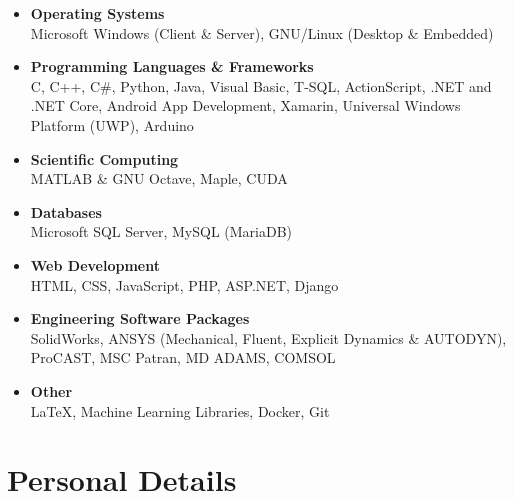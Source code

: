 \documentclass{cv}
\begin{document}
\begin{itemize}

\item
 \textbf{Operating Systems} \\ Microsoft Windows (Client \& Server), GNU/Linux (Desktop \& Embedded)
 \item
\textbf{Programming Languages \& Frameworks}\\  C, C++, C\#, Python, Java, Visual Basic, T-SQL, ActionScript, .NET and .NET Core, Android App Development, Xamarin, Universal Windows Platform (UWP), Arduino
\item
\textbf{Scientific Computing}\\  MATLAB \& GNU Octave, Maple, CUDA
\item
\textbf{Databases}\\ Microsoft SQL Server, MySQL (MariaDB)
\item
\textbf{Web Development} \\
HTML, CSS, JavaScript, PHP, ASP.NET, Django
\item
\textbf{Engineering Software Packages}\\ SolidWorks, ANSYS (Mechanical, Fluent, Explicit Dynamics \& AUTODYN), ProCAST, MSC Patran, MD ADAMS, COMSOL
\item
\textbf{Other}\\  \LaTeX{}, Machine Learning Libraries, Docker, Git

\end{itemize}


\section{Personal Details}
\end{document}
